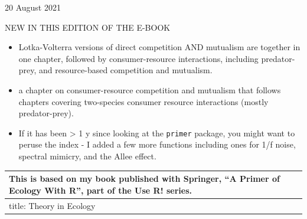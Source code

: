 \documentclass[
  10pt,
  letterpaper,
  nols]{tufte-book}
\providecommand{\tightlist}{%
  \setlength{\itemsep}{0pt}\setlength{\parskip}{0pt}}
\begin{document}
20 August 2021

NEW IN THIS EDITION OF THE E-BOOK

\begin{itemize}
\tightlist
\item
  Lotka-Volterra versions of direct competition AND mutualism are
  together in one chapter, followed by consumer-resource interactions,
  including predator-prey, and resource-based competition and mutualism.
\item
  a chapter on consumer-resource competition and mutualism that follows
  chapters covering two-species consumer resource interactions (mostly
  predator-prey).
\item
  If it has been \textgreater{} 1 y since looking at the \texttt{primer}
  package, you might want to peruse the index - I added a few more
  functions including ones for 1/f noise, spectral mimicry, and the
  Allee effect.
\end{itemize}

\begin{longtable}[]{@{}
  >{\raggedright\arraybackslash}p{}@{}}
\toprule\noalign{}
\begin{minipage}[b]{\linewidth}\raggedright
This is based on my book published with Springer, ``A Primer of Ecology
With R'', part of the Use R! series.
\end{minipage} \\
\midrule\noalign{}
\endhead
\bottomrule\noalign{}
\endlastfoot
title: Theory in Ecology \\
\end{longtable}
\end{document}
